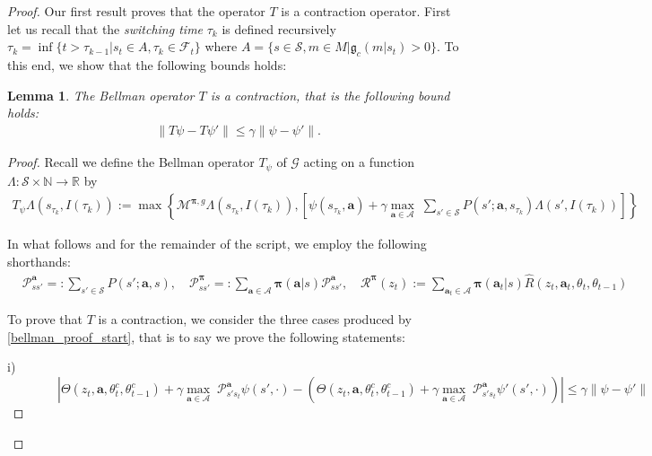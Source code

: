 \documentclass{article}
\newtheorem{lemma}{Lemma}
\begin{document}
\begin{proof}
Our first result proves that the operator  $T$ is a contraction operator. First let us recall that the \textit{switching time} $\tau_k$ is defined recursively $\tau_k=\inf\{t>\tau_{k-1}|s_t\in A,\tau_k\in\mathcal{F}_t\}$ where $A=\{s\in \mathcal{S},m\in M|\mathfrak{g}_c(m|s_t)>0\}$.
To this end, we show that the following bounds holds:
\begin{lemma}\label{lemma:bellman_contraction}
The Bellman operator $T$ is a contraction, that is the following bound holds:
\begin{align*}
&\left\|T\psi-T\psi'\right\|\leq \gamma\left\|\psi-\psi'\right\|.
\end{align*}
\end{lemma}

\begin{proof}
Recall we define the Bellman operator $T_\psi$ of $\mathcal{G}$ acting on a function $\Lambda:\mathcal{S}\times\mathbb{N}\to\mathbb{R}$ by
% 
\begin{align}
T_\psi \Lambda(s_{\tau_k},I(\tau_k)):=\max\left\{\mathcal{M}^{\boldsymbol{\pi},g}\Lambda(s_{\tau_k},I(\tau_k)),\left[ \psi(s_{\tau_k},\boldsymbol{a})+\gamma\underset{\boldsymbol{a}\in\boldsymbol{\mathcal{A}}}{\max}\;\sum_{s'\in\mathcal{S}}P(s';\boldsymbol{a},s_{\tau_k})\Lambda(s',I(\tau_k))\right]\right\}\label{bellman_proof_start}
\end{align}

In what follows and for the remainder of the script, we employ the following shorthands:
\begin{align*}
&\mathcal{P}^{\boldsymbol{a}}_{ss'}=:\sum_{s'\in\mathcal{S}}P(s';\boldsymbol{a},s), \quad\mathcal{P}^{\boldsymbol{\pi}}_{ss'}=:\sum_{\boldsymbol{a}\in\boldsymbol{\mathcal{A}}}\boldsymbol{\pi}(\boldsymbol{a}|s)\mathcal{P}^{\boldsymbol{a}}_{ss'}, \quad \mathcal{R}^{\boldsymbol{\pi}}(z_{t}):=\sum_{\boldsymbol{a}_t\in\boldsymbol{\mathcal{A}}}\boldsymbol{\pi}(\boldsymbol{a}_t|s)\hat{R}(z_t,\boldsymbol{a}_t,\theta_t,\theta_{t-1})
\end{align*}

To prove that $T$ is a contraction, we consider the three cases produced by \eqref{bellman_proof_start}, that is to say we prove the following statements:

i) $\qquad\qquad
\left| \Theta(z_t,\boldsymbol{a},\theta^c_t,\theta^c_{t-1})+\gamma\underset{\boldsymbol{a}\in\boldsymbol{\mathcal{A}}}{\max}\;\mathcal{P}^{\boldsymbol{a}}_{s's_t}\psi(s',\cdot)-\left( \Theta(z_t,\boldsymbol{a},\theta^c_t,\theta^c_{t-1})+\gamma\underset{\boldsymbol{a}\in\boldsymbol{\mathcal{A}}}{\max}\;\mathcal{P}^{\boldsymbol{a}}_{s's_t}\psi'(s',\cdot)\right)\right|\leq \gamma\left\|\psi-\psi'\right\|$


\end{proof}
\end{proof}
\end{document}
